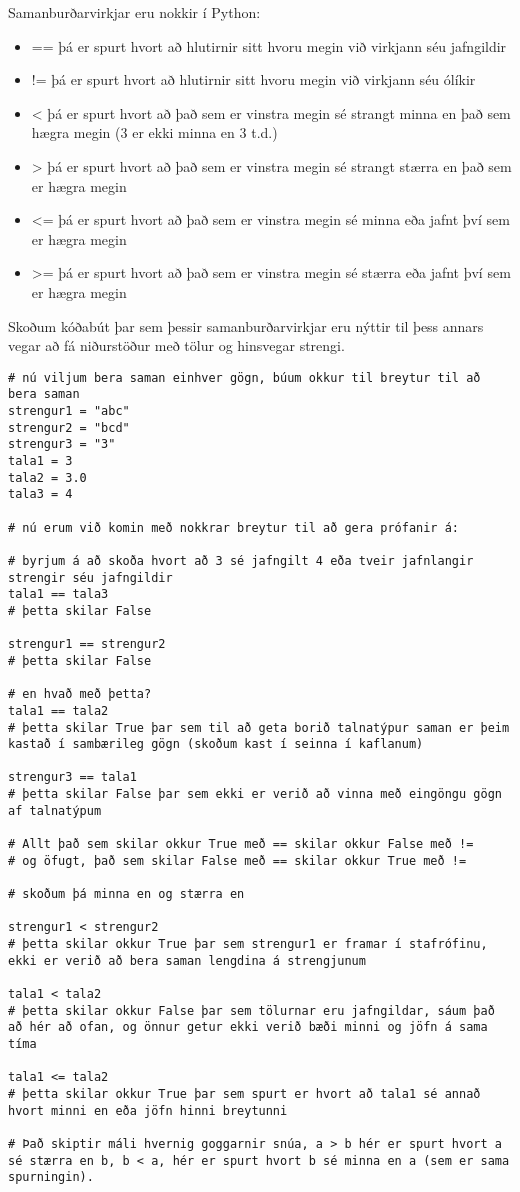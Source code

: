 Samanburðarvirkjar eru nokkir í Python:
\begin{itemize}
	\item == þá er spurt hvort að hlutirnir sitt hvoru megin við virkjann séu jafngildir
	\item != þá er spurt hvort að hlutirnir sitt hvoru megin við virkjann séu ólíkir
	\item < þá er spurt hvort að það sem er vinstra megin sé strangt minna en það sem hægra megin (3 er ekki minna en 3 t.d.)
	\item > þá er spurt hvort að það sem er vinstra megin sé strangt stærra en það sem er hægra megin
	\item <= þá er spurt hvort að það sem er vinstra megin sé minna eða jafnt því sem er hægra megin
	\item >= þá er spurt hvort að það sem er vinstra megin sé stærra eða jafnt því sem er hægra megin
\end{itemize}

Skoðum kóðabút þar sem þessir samanburðarvirkjar eru nýttir til þess annars vegar að fá niðurstöður með tölur og hinsvegar strengi.
\begin{lstlisting}[caption=Boolean gildi, label=lst:bool-samanburður]
# nú viljum bera saman einhver gögn, búum okkur til breytur til að bera saman
strengur1 = "abc"
strengur2 = "bcd"
strengur3 = "3"
tala1 = 3
tala2 = 3.0
tala3 = 4

# nú erum við komin með nokkrar breytur til að gera prófanir á:

# byrjum á að skoða hvort að 3 sé jafngilt 4 eða tveir jafnlangir strengir séu jafngildir
tala1 == tala3 
# þetta skilar False

strengur1 == strengur2
# þetta skilar False

# en hvað með þetta?
tala1 == tala2
# þetta skilar True þar sem til að geta borið talnatýpur saman er þeim kastað í sambærileg gögn (skoðum kast í seinna í kaflanum)

strengur3 == tala1 
# þetta skilar False þar sem ekki er verið að vinna með eingöngu gögn af talnatýpum

# Allt það sem skilar okkur True með == skilar okkur False með != 
# og öfugt, það sem skilar False með == skilar okkur True með !=

# skoðum þá minna en og stærra en

strengur1 < strengur2
# þetta skilar okkur True þar sem strengur1 er framar í stafrófinu, ekki er verið að bera saman lengdina á strengjunum

tala1 < tala2
# þetta skilar okkur False þar sem tölurnar eru jafngildar, sáum það að hér að ofan, og önnur getur ekki verið bæði minni og jöfn á sama tíma

tala1 <= tala2
# þetta skilar okkur True þar sem spurt er hvort að tala1 sé annað hvort minni en eða jöfn hinni breytunni

# Það skiptir máli hvernig goggarnir snúa, a > b hér er spurt hvort a sé stærra en b, b < a, hér er spurt hvort b sé minna en a (sem er sama spurningin).
\end{lstlisting}

